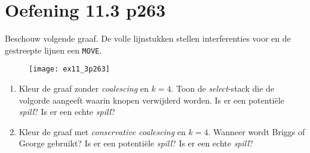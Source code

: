 \newpage
\section{Oefening 11.3 p263}
Beschouw volgende graaf. De volle lijnstukken stellen interferenties voor en de gestreepte lijnen een \texttt{MOVE}.
\begin{figure}[ht]
	\centering
	\texttt{[image: ex11\_3p263]}
\end{figure}

\begin{enumerate}
	\item Kleur de graaf zonder \textit{coalescing} en $k = 4$. Toon de \textit{select}-stack die de volgorde aangeeft waarin knopen verwijderd worden. Is er een potentiële \textit{spill}? Is er een echte \textit{spill}?
	\item Kleur de graaf met \textit{conservative coalescing} en $k = 4$. Wanneer wordt Briggs of George gebruikt?  Is er een potentiële \textit{spill}? Is er een echte \textit{spill}?
\end{enumerate}

